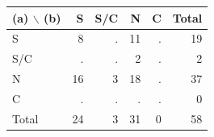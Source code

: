 \begin{center}\small
\begin{tabular}{@{}lrrrrr@{}}\toprule
(a) $\backslash$ (b) & S & S/C & N & C & Total \\ \midrule
S & 8 & . & 11 & . & 19 \\
S/C & . & . & 2 & . & 2 \\
N & 16 & 3 & 18 & . & 37 \\
C & . & . & . & . & 0 \\
\midrule Total & 24 & 3 & 31 & 0 & 58 \\
\bottomrule\end{tabular}\end{center}
